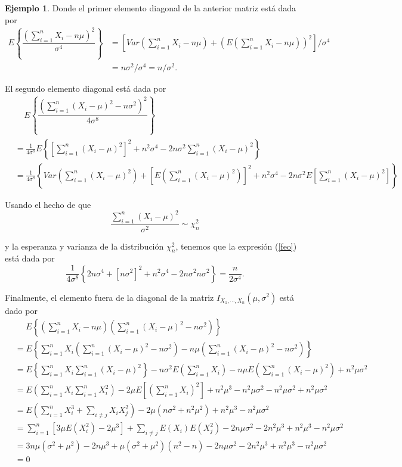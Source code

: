 \documentclass[
  10pt,
  spanish,
]{book}
\theoremstyle{definition}
\theoremstyle{definition}
\newtheorem{example}{Ejemplo}[chapter]
\theoremstyle{definition}
\theoremstyle{definition}
\theoremstyle{remark}
\begin{document}
\begin{example}
Donde el primer elemento diagonal de la anterior matriz está dada por
\begin{align*}
E\left\{\dfrac{(\sum_{i=1}^nX_i-n\mu)^2}{\sigma^4}\right\}&=\left[Var\left(\sum_{i=1}^nX_i-n\mu\right)+(E\left(\sum_{i=1}^nX_i-n\mu\right))^2\right]/\sigma^4\\
&=n\sigma^2/\sigma^4=n/\sigma^2.
\end{align*}

El segundo elemento diagonal está dada por
\begin{align}\label{feo}
&\ \ \ \ \ E\left\{\dfrac{(\sum_{i=1}^n(X_i-\mu)^2-n\sigma^2)^2}{4\sigma^8}\right\}\\
&=\frac{1}{4\sigma^8}E\left\{\left[\sum_{i=1}^n(X_i-\mu)^2\right]^2+n^2\sigma^4-2n\sigma^2\sum_{i=1}^n(X_i-\mu)^2\right\}\\
&=\frac{1}{4\sigma^8}\left\{Var(\sum_{i=1}^n(X_i-\mu)^2)+\left[E(\sum_{i=1}^n(X_i-\mu)^2)\right]^2+n^2\sigma^4-2n\sigma^2E\left[\sum_{i=1}^n(X_i-\mu)^2\right]\right\}
\end{align}

Usando el hecho de que
\begin{equation*}
\frac{\sum_{i=1}^n(X_i-\mu)^2}{\sigma^2}\sim\chi^2_n
\end{equation*}

y la esperanza y varianza de la distribución \(\chi^2_n\), tenemos que la expresión (\ref{feo}) está dada por
\begin{equation*}
\frac{1}{4\sigma^8}\left\{2n\sigma^4+\left[n\sigma^2\right]^2+n^2\sigma^4-2n\sigma^2n\sigma^2\right\}=\frac{n}{2\sigma^4}.
\end{equation*}

Finalmente, el elemento fuera de la diagonal de la matriz \(I_{X_1,\cdots,X_n}(\mu,\sigma^2)\) está dado por
\begin{align*}
&\ \ \ \ \ \ E\left\{\left(\sum_{i=1}^nX_i-n\mu\right)\left(\sum_{i=1}^n(X_i-\mu)^2-n\sigma^2\right)\right\}\\
&=E\left\{\sum_{i=1}^nX_i\left(\sum_{i=1}^n(X_i-\mu)^2-n\sigma^2\right)-n\mu\left(\sum_{i=1}^n(X_i-\mu)^2-n\sigma^2\right)\right\}\\
&=E\left\{\sum_{i=1}^nX_i\sum_{i=1}^n(X_i-\mu)^2\right\}-n\sigma^2E\left(\sum_{i=1}^nX_i\right)-n\mu E\left(\sum_{i=1}^n(X_i-\mu)^2\right)+n^2\mu\sigma^2\\
&=E\left(\sum_{i=1}^nX_i\sum_{i=1}^nX_i^2\right)-2\mu E\left[(\sum_{i=1}^nX_i)^2\right]+n^2\mu^3-n^2\mu\sigma^2-n^2\mu\sigma^2+n^2\mu\sigma^2\\
&=E\left(\sum_{i=1}^nX_i^3+\sum_{i\neq j}X_iX_j^2\right)-2\mu(n\sigma^2+n^2\mu^2)+n^2\mu^3-n^2\mu\sigma^2\\
&=\sum_{i=1}^n\left[3\mu E(X_i^2)-2\mu^3\right]+\sum_{i\neq j}E(X_i)E(X_j^2)-2n\mu\sigma^2-2n^2\mu^3+n^2\mu^3-n^2\mu\sigma^2\\
&=3n\mu(\sigma^2+\mu^2)-2n\mu^3+\mu(\sigma^2+\mu^2)(n^2-n)-2n\mu\sigma^2-2n^2\mu^3+n^2\mu^3-n^2\mu\sigma^2\\
&=0
\end{align*}


\end{example}
\end{document}
